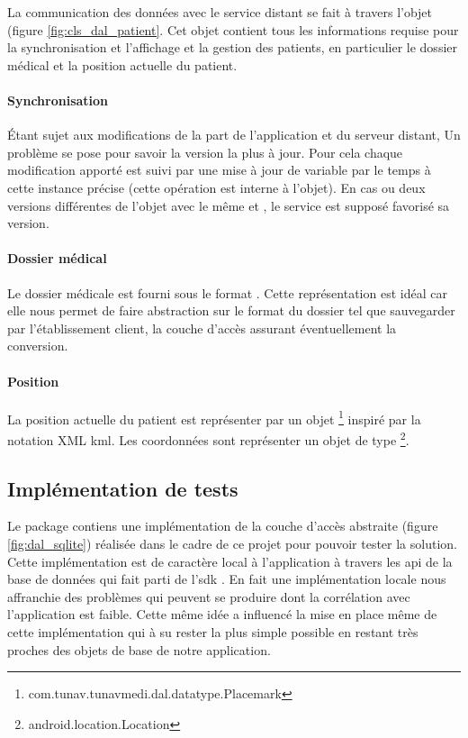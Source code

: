 La communication des données avec le service distant se fait à travers l'objet  (figure \ref{fig:cls_dal_patient}. Cet objet contient tous les informations requise pour la synchronisation et l'affichage et la gestion des patients, en particulier le dossier médical et la position actuelle du patient.

\paragraph{Synchronisation}
Étant sujet aux modifications de la part de l'application et du serveur distant, Un problème se pose pour savoir la version la plus à jour. Pour cela chaque modification apporté est suivi par une mise à jour de variable  par le temps à cette instance précise (cette opération est interne à l'objet). En cas ou deux versions différentes de l'objet  avec le même  et , le service est supposé favorisé sa version.

\paragraph{Dossier médical}

Le dossier médicale est fourni sous le format . Cette représentation est idéal car elle nous permet de faire abstraction sur le format du dossier tel que sauvegarder par l'établissement client, la couche d’accès assurant éventuellement la conversion.


\paragraph{Position}

La position actuelle du patient est représenter par un objet \footnote{com.tunav.tunavmedi.dal.datatype.Placemark} inspiré par la notation XML \gls{kml}. Les coordonnées sont représenter un objet de type \footnote{android.location.Location}.

\subsection{Implémentation de tests}\label{subsection:dal_impl}

Le package  contiens une
implémentation de la couche d’accès abstraite (figure
\ref{fig:dal_sqlite}) réalisée dans le cadre de ce projet pour
pouvoir tester la solution. Cette implémentation est de caractère local
à l'application à travers les \gls{api} de la base de données
 qui fait parti de l'\gls{sdk} \android{}. En fait une
implémentation locale nous affranchie des problèmes qui peuvent se
produire dont la corrélation avec l'application est faible. Cette même
idée a influencé la mise en place même de cette implémentation qui à su
rester la plus simple possible en restant très proches des objets de
base de notre application.

